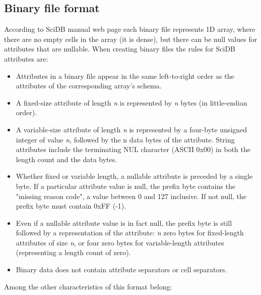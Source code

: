 \subsection{Binary file format}
According to SciDB manual web page \cite{scidbBinForm} each binary file represents 1D array, where there are no empty cells in the array (it is dense), but there can be null values for attributes that are nullable. When creating binary files the rules for SciDB attributes are:
\begin{itemize}
\item Attributes in a binary file appear in the same left-to-right order as the attributes of the corresponding array's schema.
\item A fixed-size attribute of length \textit{n} is represented by \textit{n} bytes (in little-endian order).
\item A variable-size attribute of length \textit{n} is represented by a four-byte unsigned integer of value \textit{n}, followed by the n data bytes of the attribute. String attributes include the terminating NUL character (ASCII 0x00) in both the length count and the data bytes.
\item Whether fixed or variable length, a nullable attribute is preceded by a single byte. If a particular attribute value is null, the prefix byte contains the "missing reason code", a value between 0 and 127 inclusive. If not null, the prefix byte must contain 0xFF (-1).
\item Even if a nullable attribute value is in fact null, the prefix byte is still followed by a representation of the attribute: \textit{n} zero bytes for fixed-length attributes of size \textit{n}, or four zero bytes for variable-length attributes (representing a length count of zero).
\item Binary data does not contain attribute separators or cell separators.
\end{itemize}
Among the other characteristics of this format belong:
